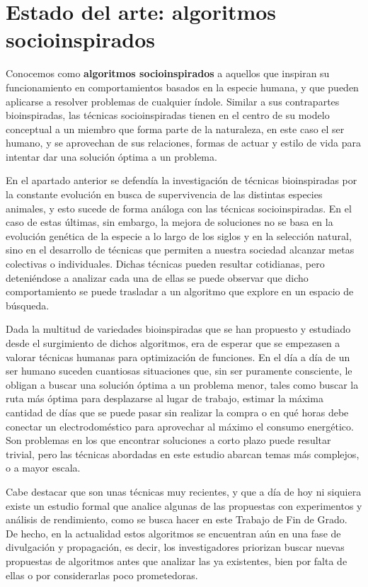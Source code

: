 \section{Estado del arte: algoritmos socioinspirados}

Conocemos como \textbf{algoritmos socioinspirados} a aquellos que inspiran su funcionamiento en comportamientos basados en la especie humana, y que pueden aplicarse a resolver problemas de cualquier índole. Similar a sus contrapartes bioinspiradas, las técnicas socioinspiradas tienen en el centro de su modelo conceptual a un miembro que forma parte de la naturaleza, en este caso el ser humano, y se aprovechan de sus relaciones, formas de actuar y estilo de vida para intentar dar una solución óptima a un problema.

En el apartado anterior se defendía la investigación de técnicas bioinspiradas por la constante evolución en busca de supervivencia de las distintas especies animales, y esto sucede de forma análoga con las técnicas socioinspiradas. En el caso de estas últimas, sin embargo, la mejora de soluciones no se basa en la evolución genética de la especie a lo largo de los siglos y en la selección natural, sino en el desarrollo de técnicas que permiten a nuestra sociedad alcanzar metas colectivas o individuales. Dichas técnicas pueden resultar cotidianas, pero deteniéndose a analizar cada una de ellas se puede observar que dicho comportamiento se puede trasladar a un algoritmo que explore en un espacio de búsqueda.

Dada la multitud de variedades bioinspiradas que se han propuesto y estudiado desde el surgimiento de dichos algoritmos, era de esperar que se empezasen a valorar técnicas humanas para optimización de funciones. En el día a día de un ser humano suceden cuantiosas situaciones que, sin ser puramente consciente, le obligan a buscar una solución óptima a un problema menor, tales como buscar la ruta más óptima para desplazarse al lugar de trabajo, estimar la máxima cantidad de días que se puede pasar sin realizar la compra o en qué horas debe conectar un electrodoméstico para aprovechar al máximo el consumo energético. Son problemas en los que encontrar soluciones a corto plazo puede resultar trivial, pero las técnicas abordadas en este estudio abarcan temas más complejos, o a mayor escala.

Cabe destacar que son unas técnicas muy recientes, y que a día de hoy ni siquiera existe un estudio formal que analice algunas de las propuestas con experimentos y análisis de rendimiento, como se busca hacer en este Trabajo de Fin de Grado. De hecho, en la actualidad estos algoritmos se encuentran aún en una fase de divulgación y propagación, es decir, los investigadores priorizan buscar nuevas propuestas de algoritmos antes que analizar las ya existentes, bien por falta de ellas o por considerarlas poco prometedoras.

